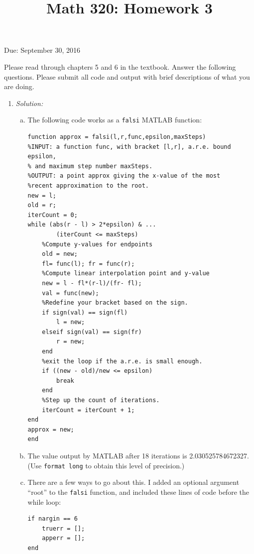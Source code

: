 \documentclass[12pt]{amsart}
\begin{document}
\title{Math 320: Homework 3}
Due: September 30, 2016
\maketitle

Please read through chapters 5 and 6 in the textbook.
Answer the following questions. Please submit all code
and output with brief descriptions of what you are doing.

\vspace{5mm}

\begin{enumerate}

\item {\em Solution:} \begin{enumerate}[(a)]
\item The following code works as a {\tt falsi} MATLAB function:
\begin{verbatim}
function approx = falsi(l,r,func,epsilon,maxSteps)
%INPUT: a function func, with bracket [l,r], a.r.e. bound epsilon,
% and maximum step number maxSteps.
%OUTPUT: a point approx giving the x-value of the most
%recent approximation to the root.
new = l;
old = r;
iterCount = 0;
while (abs(r - l) > 2*epsilon) & ... 
        (iterCount <= maxSteps)
    %Compute y-values for endpoints
    old = new;
    fl= func(l); fr = func(r);
    %Compute linear interpolation point and y-value
    new = l - fl*(r-l)/(fr- fl);
    val = func(new);
    %Redefine your bracket based on the sign.
    if sign(val) == sign(fl)
        l = new;
    elseif sign(val) == sign(fr)
        r = new;
    end
    %exit the loop if the a.r.e. is small enough.
    if ((new - old)/new <= epsilon)
        break
    end
    %Step up the count of iterations.
    iterCount = iterCount + 1;
end
approx = new;
end

\end{verbatim}

\item The value output by MATLAB after 18 iterations is
2.030525784672327. (Use {\tt format long} to obtain this
level of precision.)

\item There are a few ways to go about this. I added an
optional argument ``root'' to the {\tt falsi} function,
and included these lines of code before the while loop:
\begin{verbatim}
if nargin == 6
    truerr = [];
    apperr = [];
end
\end{verbatim}


\end{enumerate}
\end{enumerate}
\end{document}
